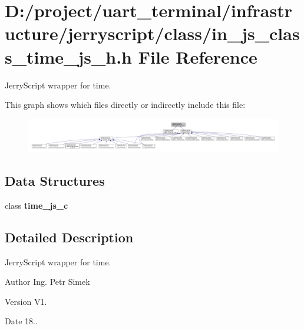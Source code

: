 \section{D\+:/project/uart\+\_\+terminal/infrastructure/jerryscript/class/in\+\_\+js\+\_\+class\+\_\+time\+\_\+js\+\_\+h.h File Reference}
\label{in__js__class__time__js__h_8h}


Jerry\+Script wrapper for time.  


This graph shows which files directly or indirectly include this file\+:\nopagebreak
\begin{figure}[H]
\begin{center}
\leavevmode
\includegraphics[width=350pt]{in__js__class__time__js__h_8h__dep__incl}
\end{center}
\end{figure}
\subsection*{Data Structures}
\begin{DoxyCompactItemize}
\item 
class \textbf{ time\+\_\+js\+\_\+c}
\end{DoxyCompactItemize}


\subsection{Detailed Description}
Jerry\+Script wrapper for time. 

\begin{DoxyAuthor}{Author}
Ing. Petr Simek 
\end{DoxyAuthor}
\begin{DoxyVersion}{Version}
V1. 
\end{DoxyVersion}
\begin{DoxyDate}{Date}
18.. 
\end{DoxyDate}
